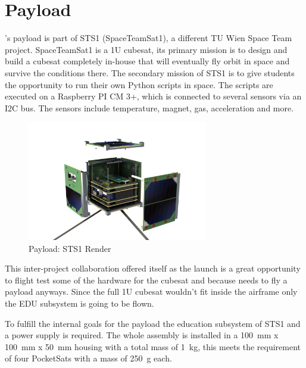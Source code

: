 \section{Payload}
\label{sec:payload}

\uH's payload is part of STS1 (SpaceTeamSat1), a different TU Wien Space Team project. SpaceTeamSat1 is a 1U cubesat, its primary mission is to design and build a cubesat completely in-house that will eventually fly orbit in space and survive the conditions there. The secondary mission of STS1 is to give students the opportunity to run their own Python scripts in space. The scripts are executed on a Raspberry PI CM 3+, which is connected to several sensors via an I2C bus. The sensors include temperature, magnet, gas, acceleration and more.

\begin{figure}
    \centering
    \includegraphics[width=0.7\textwidth]{Payload/STS1_Payload.png}
    \caption{Payload: STS1 Render}
    \label{fig:payload_render}
\end{figure}

This inter-project collaboration offered itself as the \uH launch is a great opportunity to flight test some of the hardware for the cubesat and because \uH needs to fly a payload anyways. Since the full 1U cubesat wouldn't fit inside the \uH airframe only the EDU subsystem is going to be flown.

To fulfill the internal goals for the payload the education subsystem of STS1 and a power supply is required. The whole assembly is installed in a \SI{100}{\milli\meter} x \SI{100}{\milli\meter} x \SI{50}{\milli\meter} housing with a total mass of \SI{1}{\kilogram}, this meets the requirement of four PocketSats with a mass of \SI{250}{\gram} each.